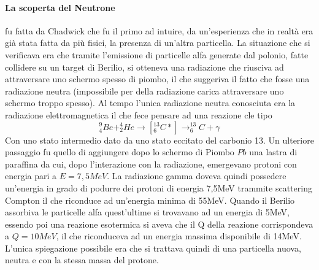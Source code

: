 \paragraph{La scoperta del Neutrone} fu fatta da Chadwick che fu il primo ad intuire, da un'esperienza che in realtà era già stata fatta da più fisici, la presenza di un'altra particella. 
La situazione che si verificava era che tramite l'emissione di particelle alfa generate dal polonio, fatte collidere su un target di Berilio, si otteneva una radiazione che riusciva ad attraversare uno schermo spesso di piombo, il che suggeriva il fatto che fosse una radiazione neutra (impossibile per della radiazione carica attraversare uno schermo troppo spesso). 
Al tempo l'unica radiazione neutra conosciuta era la radiazione elettromagnetica il che fece pensare ad una reazione cle tipo
\[
^9_4Be+^4_2He\longrightarrow[^{13}_6C*]\longrightarrow^{13}_6C+\gamma
\]
Con uno stato intermedio dato da uno stato eccitato del carbonio 13.
Un ulteriore passaggio fu quello di aggiungere dopo lo schermo di Piombo $Pb$ una lastra di paraffina da cui, dopo l'interazione con la radiazione, emergevano protoni con energia pari a $E=7,5MeV$. 
La radiazione gamma doveva quindi possedere un'energia in grado di podurre dei protoni di energia 7,5MeV trammite scattering Compton il che riconduce ad un'energia minima di 55MeV.
Quando il Berilio assorbiva le particelle alfa quest'ultime si trovavano ad un energia di 5MeV, essendo poi una reazione esotermica si aveva che il Q della reazione corrispondeva a $Q=10MeV$, il che riconduceva ad un energia massima disponibile di 14MeV.
L'unica spiegazione possibile era che si trattava quindi di una particella nuova, neutra e con la stessa massa del protone.
